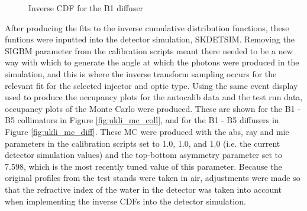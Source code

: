 \begin{figure}
\begin{minipage}{0.5\textwidth}
        \caption{Inverse CDF for the B1 diffuser}
        \label{fig:B1_PDF_CDF_inv_diff}
    \end{minipage}
\end{figure}


After producing the fits to the inverse cumulative distribution functions, these funtions were inputted into the detector simulation, SKDETSIM. Removing the SIGBM parameter from the calibration scripts meant there needed to be a new way with which to generate the angle at which the photons were produced in the simulation, and this is where the inverse transform sampling occurs for the relevant fit for the selected injector and optic type. Using the same event display used to produce the occupancy plots for the autocalib data and the test run data, occupancy plots of the Monte Carlo were produced. These are shown for the B1 - B5 collimators in Figure \ref{fig:ukli_mc_coll}, and for the B1 - B5 diffusers in Figure \ref{fig:ukli_mc_diff}. These MC were produced with the abs, ray and mie parameters in the calibration scripts set to 1.0, 1.0, and 1.0 (i.e. the current detector simulation values) and the top-bottom asymmetry parameter set to 7.598, which is the most recently tuned value of this parameter. Because the original profiles from the test stands were taken in air, adjustments were made so that the refractive index of the water in the detector was taken into account when implementing the inverse CDFs into the detector simulation. 

